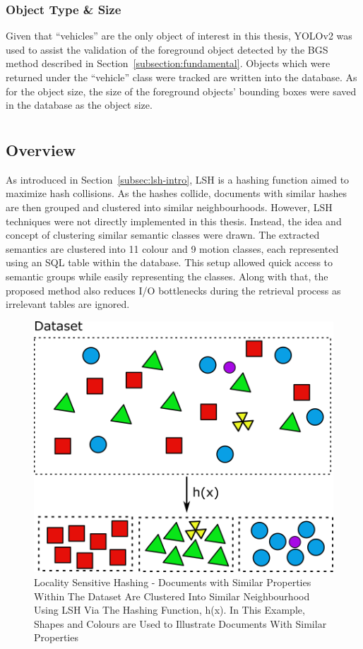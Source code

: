 \subsubsection{Object Type \& Size}
\label{objecttype}
Given that ``vehicles'' are the only object of interest in this thesis, YOLOv2 was used to assist the validation of the foreground object detected by the BGS method described in Section~\ref{subsection:fundamental}. Objects which were returned under the ``vehicle'' class were tracked are written into the database. As for the object size, the size of the foreground objects' bounding boxes were saved in the database as the object size.


\section{\versionOneExt }
\label{section:semantic_lsh}

\subsection{Overview}
As introduced in Section~\ref{subsec:lsh-intro}, LSH is a hashing function aimed to maximize hash collisions.
As the hashes collide, documents with similar hashes are then grouped and clustered into similar neighbourhoods.
However, LSH techniques were not directly implemented in this thesis. Instead, the idea and concept of clustering similar semantic classes were drawn.
The extracted semantics are clustered into 11 colour and 9 motion classes, each represented using an SQL table within the database.
This setup allowed quick access to semantic groups while easily representing the classes. Along with that, the proposed method also reduces I/O bottlenecks during the retrieval process as irrelevant tables are ignored.


\begin{figure}[hbt!]\centering
\includegraphics[width=.7\textwidth]{image/new/lsh.png}
\caption{Locality Sensitive Hashing - Documents with Similar Properties Within The Dataset Are Clustered Into Similar Neighbourhood Using LSH Via The Hashing Function, h(x). In This Example, Shapes and Colours are Used to Illustrate Documents With Similar Properties}
\label{fig:lshexample}
\end{figure}

